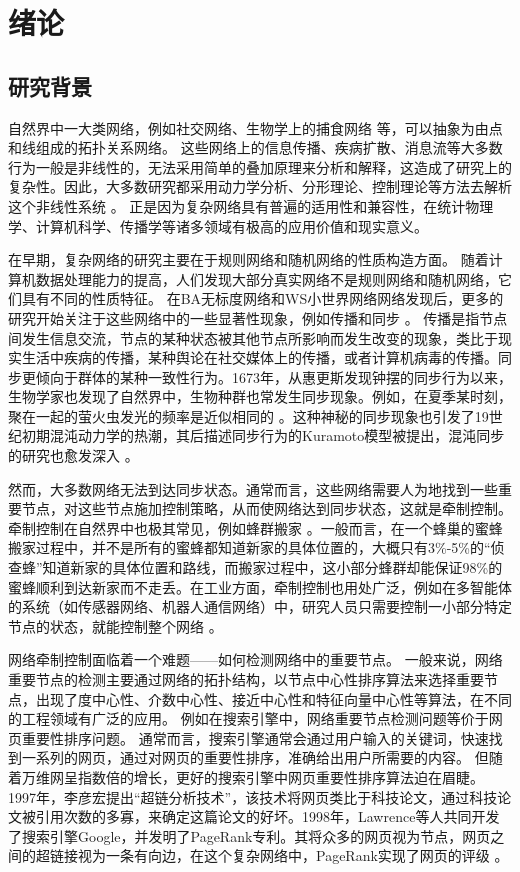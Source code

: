 \section{绪论}
\subsection{研究背景}
自然界中一大类网络，例如社交网络、生物学上的捕食网络 \cite{Ringma2018}等，可以抽象为由点和线组成的拓扑关系网络。
这些网络上的信息传播、疾病扩散、消息流等大多数行为一般是非线性的，无法采用简单的叠加原理来分析和解释，这造成了研究上的复杂性。因此，大多数研究都采用动力学分析、分形理论、控制理论等方法去解析这个非线性系统 \cite{Wang2017, 汪小帆2006}。
正是因为复杂网络具有普遍的适用性和兼容性，在统计物理学、计算机科学、传播学等诸多领域有极高的应用价值和现实意义。

在早期，复杂网络的研究主要在于规则网络和随机网络的性质构造方面。
随着计算机数据处理能力的提高，人们发现大部分真实网络不是规则网络和随机网络，它们具有不同的性质特征。
在BA无标度网络和WS小世界网络网络发现后，更多的研究开始关注于这些网络中的一些显著性现象，例如传播和同步 \cite{汪小帆2006, Liao2017, Holme2019}。
传播是指节点间发生信息交流，节点的某种状态被其他节点所影响而发生改变的现象，类比于现实生活中疾病的传播，某种舆论在社交媒体上的传播，或者计算机病毒的传播。同步更倾向于群体的某种一致性行为。1673年，从惠更斯发现钟摆的同步行为以来，生物学家也发现了自然界中，生物种群也常发生同步现象。例如，在夏季某时刻，聚在一起的萤火虫发光的频率是近似相同的 \cite{Brandner2016}。这种神秘的同步现象也引发了19世纪初期混沌动力学的热潮，其后描述同步行为的Kuramoto模型被提出，混沌同步的研究也愈发深入 \cite{Rodrigues2016}。

然而，大多数网络无法到达同步状态。通常而言，这些网络需要人为地找到一些重要节点，对这些节点施加控制策略，从而使网络达到同步状态，这就是牵制控制\cite{Zhou2016}。牵制控制在自然界中也极其常见，例如蜂群搬家 \cite{Kennedy2006}。一般而言，在一个蜂巢的蜜蜂搬家过程中，并不是所有的蜜蜂都知道新家的具体位置的，大概只有3\%-5\%的“侦查蜂”知道新家的具体位置和路线，而搬家过程中，这小部分蜂群却能保证98\%的蜜蜂顺利到达新家而不走丢。在工业方面，牵制控制也用处广泛，例如在多智能体的系统（如传感器网络、机器人通信网络）中，研究人员只需要控制一小部分特定节点的状态，就能控制整个网络 \cite{He2017, Chen2017}。

网络牵制控制面临着一个难题——如何检测网络中的重要节点。
一般来说，网络重要节点的检测主要通过网络的拓扑结构，以节点中心性排序算法来选择重要节点，出现了度中心性、介数中心性、接近中心性和特征向量中心性等算法，在不同的工程领域有广泛的应用。
例如在搜索引擎中，网络重要节点检测问题等价于网页重要性排序问题。
通常而言，搜索引擎通常会通过用户输入的关键词，快速找到一系列的网页，通过对网页的重要性排序，准确给出用户所需要的内容。
但随着万维网呈指数倍的增长，更好的搜索引擎中网页重要性排序算法迫在眉睫。
1997年，李彦宏提出“超链分析技术”，该技术将网页类比于科技论文，通过科技论文被引用次数的多寡，来确定这篇论文的好坏。1998年，Lawrence等人共同开发了搜索引擎Google，并发明了PageRank专利。其将众多的网页视为节点，网页之间的超链接视为一条有向边，在这个复杂网络中，PageRank实现了网页的评级 \cite{Page1999}。

